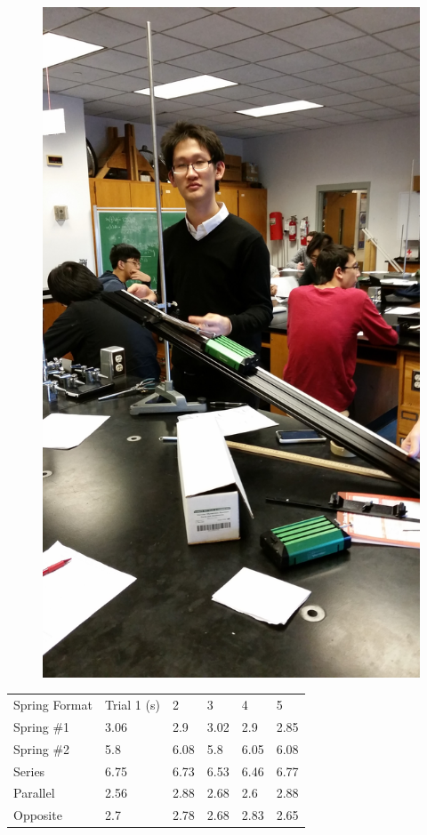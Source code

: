 \documentclass[11pt, titlepage]{article}
\begin{document}
\begin{figure}[p]
\centering
\hspace*{-10.5cm}
\includegraphics[scale=0.15, angle=270]{lab5.jpg}
\vspace*{19cm}
\end{figure}

\begin{center}
\begin{tabular}
{|m{5em}|m{5em}|m{5em}|m{5em}|m{5em}|m{5em}|}
Spring Format & Trial 1 (s) & 2 & 3 & 4 & 5 \\
Spring \#1 & 3.06 & 2.9 & 3.02 & 2.9 & 2.85 \\
Spring \#2 & 5.8 & 6.08 & 5.8 & 6.05 & 6.08 \\
Series & 6.75 & 6.73 & 6.53 & 6.46 & 6.77 \\
Parallel & 2.56 & 2.88 & 2.68 & 2.6 & 2.88 \\
Opposite & 2.7 & 2.78 & 2.68 & 2.83 & 2.65 \\
\end{tabular}
\end{center}
\end{document}
